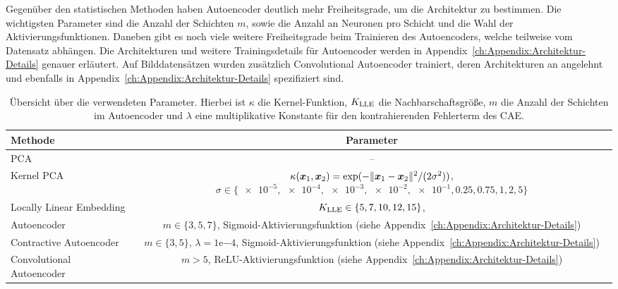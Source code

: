 Gegenüber den statistischen Methoden haben Autoencoder deutlich mehr Freiheitsgrade, um die
Architektur zu bestimmen. Die wichtigsten Parameter sind die Anzahl der Schichten $m$, sowie die
Anzahl an Neuronen pro Schicht und die Wahl der Aktivierungsfunktionen. Daneben gibt es noch viele
weitere Freiheitsgrade beim Trainieren des Autoencoders, welche teilweise vom Datensatz abhängen.
Die Architekturen und weitere Trainingsdetails für Autoencoder werden in
Appendix~\ref{ch:Appendix:Architektur-Details} genauer erläutert. Auf Bilddatensätzen wurden
zusätzlich Convolutional Autoencoder trainiert, deren Architekturen an \textcite[14]{Ghosh.2019}
angelehnt und ebenfalls in Appendix~\ref{ch:Appendix:Architektur-Details} spezifiziert sind.

\begin{table}[ht]
	\tymax=300pt
	\centering
	\begin{tabulary}{\linewidth}{LC}
		\toprule
		Methode                            & Parameter                                                            \\ \midrule
		PCA      & --                                                                   \\
		Kernel PCA                         & $\kappa(\bm{x}_1, \bm{x}_2) = \exp(- \lVert\bm{x}_1 - \bm{x}_2\rVert^2/(2\sigma^2))$, $\sigma \in \{\num{e-5},\num{e-4}, \num{e-3}, \num{e-2}, \num{e-1}, 0.25, 0.75, 1, 2, 5\}$ \\
		Locally Linear Embedding     & $K_{\text{LLE}} \in \{ 5, 7, 10, 12, 15\}$,                      \\
		Autoencoder                  & $m \in \{3, 5, 7\}$, Sigmoid-Aktivierungsfunktion \newline (siehe
		Appendix~\ref{ch:Appendix:Architektur-Details})                                                           \\  Contractive Autoencoder & $m \in \{3, 5\}$, $\lambda=1\mathrm{e}{-4}$,
		Sigmoid-Aktivierungsfunktion (siehe Appendix~\ref{ch:Appendix:Architektur-Details})                       \\
		Convolutional Autoencoder & $m > 5$, ReLU-Aktivierungsfunktion \newline (siehe
		Appendix~\ref{ch:Appendix:Architektur-Details})                                                           \\ \bottomrule
	\end{tabulary}
	\caption[Übersicht über die verwendeten Parameter der Methoden]{Übersicht über die verwendeten Parameter. Hierbei ist $\kappa$ die Kernel-Funktion, $K_{\text{LLE}}$ die Nachbarschaftsgröße, $m$ die Anzahl der Schichten im Autoencoder und $\lambda$ eine multiplikative Konstante für den kontrahierenden Fehlerterm des CAE.}
	\label{tab:uebersicht-parameter}
\end{table}
